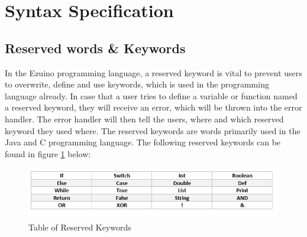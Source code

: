 \section{Syntax Specification}
\subsection{Reserved words \& Keywords}
In the Ezuino programming language, a reserved keyword is vital to prevent users to overwrite, define and use keywords, which is used in the programming language already. In case that a user tries to define a variable or function named a reserved keyword, they will receive an error, which will be thrown into the error handler. The error handler will then tell the users, where and which reserved keyword they used where. The reserved keywords are words primarily used in the Java and C programming language. The following reserved keywords can be found in figure \ref{rk} below:
\begin{figure}[H]
\centering
\includegraphics[scale=0.90]{figures/reservedK.png}
\caption{Table of Reserved Keywords}
\label{rk}
\end{figure}

